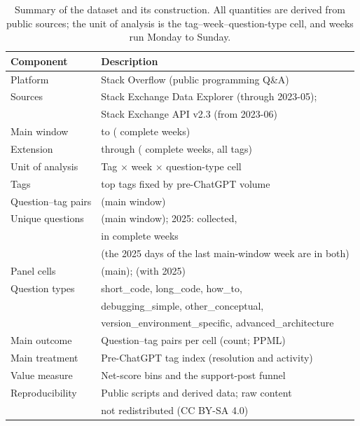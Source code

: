\begin{table}[ht]
\centering
\caption{Summary of the dataset and its construction. All quantities are derived from public sources; the unit of analysis is the tag--week--question-type cell, and weeks run Monday to Sunday.}
\label{tab:dataset_summary}
\small
\begin{tabular}{ll}
\toprule
Component & Description \\
\midrule
Platform & Stack Overflow (public programming Q\&A) \\
Sources & Stack Exchange Data Explorer (through 2023-05); \\
        & Stack Exchange API v2.3 (from 2023-06) \\
Main window & \RWeekFirst{} to \RMainLastDay{} (\RNWeeksMain{} complete weeks) \\
Extension & through \RExtLastDay{} (\RNWeeksExt{} complete weeks, all \RNTags{} tags) \\
Unit of analysis & Tag $\times$ week $\times$ question-type cell \\
Tags & \RNTags{} top tags fixed by pre-ChatGPT volume \\
Question--tag pairs & \RNPairsMain{} (main window) \\
Unique questions & \RNUniqueMain{} (main window); 2025: \RNCollectedTwentyFive{} collected, \\
        & \RNUniqueTwentyFive{} in complete weeks \\
        & (the 2025 days of the last main-window week are in both) \\
Panel cells & \RNCellsMain{} (main); \RNCellsExt{} (with 2025) \\
Question types & short\_code, long\_code, how\_to, \\
        & debugging\_simple, other\_conceptual, \\
        & version\_environment\_specific, advanced\_architecture \\
Main outcome & Question--tag pairs per cell (count; PPML) \\
Main treatment & Pre-ChatGPT tag index (resolution and activity) \\
Value measure & Net-score bins and the support-post funnel \\
Reproducibility & Public scripts and derived data; raw content \\
        & not redistributed (CC BY-SA 4.0) \\
\bottomrule
\end{tabular}
\end{table}
